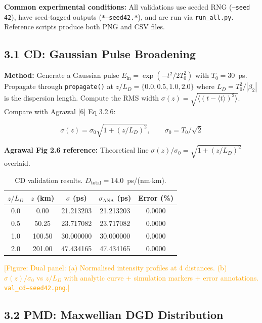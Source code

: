 \documentclass[11pt,a4paper]{article}
\newcommand{\figref}[1]{\textcolor{orange}{[Figure: #1]}}
\begin{document}
\noindent\textbf{Common experimental conditions:} All validations use
seeded RNG (\texttt{--seed 42}), have seed-tagged outputs (\texttt{*--seed42.*}),
and are run via \texttt{run\_all.py}.  Reference scripts produce both PNG
and CSV files.

\subsection{3.1 CD: Gaussian Pulse Broadening}
\label{sec:val-cd}

\textbf{Method:} Generate a Gaussian pulse $E_{\text{in}} = 
\exp(-t^2/2T_0^2)$ with $T_0 = 30$~ps.  Propagate through
\texttt{propagate()} at $z/L_D = \{0.0, 0.5, 1.0, 2.0\}$ where
$L_D = T_0^2/|\beta_2|$ is the dispersion length.  Compute the RMS
width $\sigma(z) = \sqrt{\langle(t - \langle t\rangle)^2\rangle}$.
Compare with Agrawal [6] Eq 3.2.6:

\begin{equation}
  \sigma(z) = \sigma_0\sqrt{1 + (z/L_D)^2},
  \qquad \sigma_0 = T_0/\sqrt{2}
\end{equation}

\textbf{Agrawal Fig 2.6 reference:} Theoretical line
$\sigma(z)/\sigma_0 = \sqrt{1 + (z/L_D)^2}$ overlaid.

\begin{table}[!ht]
  \caption{CD validation results.  $D_{\text{total}} = 14.0$~ps/(nm$\cdot$km).}
  \label{tab:cd-results}
  \begin{tabular}{c c c c c}
    \toprule
    $z/L_D$ & $z$ (km) & $\sigma$ (ps) & $\sigma_{\text{ANA}}$ (ps) & Error (\%) \\
    \midrule
    0.0 &   0.00 & 21.213203 & 21.213203 & 0.0000 \\
    0.5 &  50.25 & 23.717082 & 23.717082 & 0.0000 \\
    1.0 & 100.50 & 30.000000 & 30.000000 & 0.0000 \\
    2.0 & 201.00 & 47.434165 & 47.434165 & 0.0000 \\
    \bottomrule
  \end{tabular}
\end{table}

\figref{Dual panel: (a) Normalised intensity profiles at 4 distances.
  (b) $\sigma(z)/\sigma_0$ vs $z/L_D$ with analytic curve + simulation
  markers + error annotations.  {\tt val\_cd--seed42.png}.}

\subsection{3.2 PMD: Maxwellian DGD Distribution}
\label{sec:val-pmd}
\end{document}
